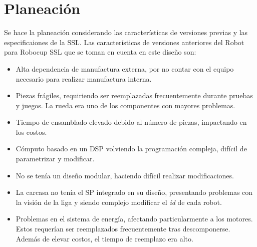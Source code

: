 \section {Planeación}

Se hace la planeación considerando las características de versiones previas y las especificaiones de la \gls{SSL}.
Las características de versiones anteriores del Robot para Robocup \gls{SSL} que se toman en cuenta en este diseño son:
\begin{itemize}
	\item Alta dependencia de manufactura externa, por no contar con el equipo necesario para realizar manufactura interna.
	\item Piezas frágiles, requiriendo ser reemplazadas frecuentemente durante pruebas y juegos. La rueda era uno de los componentes con mayores problemas.
	\item Tiempo de ensamblado elevado debido al número de piezas, impactando en los costos.
	\item Cómputo basado en un \gls{DSP} volviendo la programación compleja, difícil de parametrizar y modificar.
	\item No se tenía un diseño modular, haciendo difícil realizar modificaciones. 
	\item La carcasa no tenía el \gls{SP} integrado en su diseño, presentando problemas con la visión de la liga y siendo complejo modificar el \textit{id} de cada robot.
	\item Problemas en el sistema de energía, afectando particularmente a los motores. Estos requerían ser reemplazados frecuentemente tras descomponerse. Además de elevar costos, el tiempo de reemplazo era alto.


\end{itemize}
